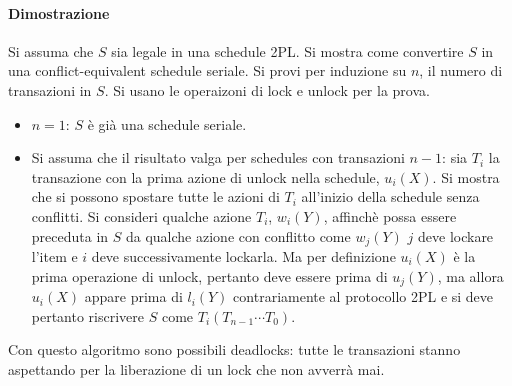 \paragraph{Dimostrazione}
Si assuma che $S$ sia legale in una schedule 2PL. Si mostra come convertire $S$ in una conflict-equivalent schedule seriale. Si provi per induzione su $n$, il numero di transazioni in $S$. Si usano le operaizoni
di lock e unlock per la prova.
\begin{itemize}
\item $n=1$: $S$ \`e gi\`a una schedule seriale. 
\item Si assuma che il risultato valga per schedules con transazioni $n-1$: sia $T_i$ la transazione con la prima azione di unlock nella schedule, $u_i(X)$. Si mostra che si possono spostare tutte le azioni di $T_i$
all'inizio della schedule senza conflitti. Si consideri qualche azione $T_i$, $w_i(Y)$, affinch\`e possa essere preceduta in $S$ da qualche azione con conflitto come $w_j(Y)$ $j$ deve lockare l'item e $i$ deve
successivamente lockarla. Ma per definizione $u_i(X)$ \`e la prima operazione di unlock, pertanto deve essere prima di $u_j(Y)$, ma allora $u_i(X)$ appare prima di $l_i(Y)$ contrariamente al protocollo 2PL e 
si deve pertanto riscrivere $S$ come $T_i(T_{n-1}\cdots T_0)$.
\end{itemize}
Con questo algoritmo sono possibili deadlocks: tutte le transazioni stanno aspettando per la liberazione di un lock che non avverr\`a mai. 